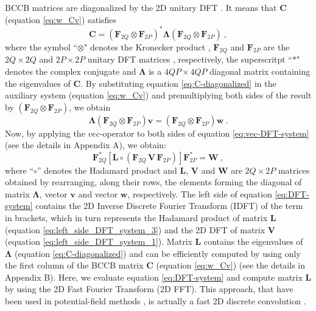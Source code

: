 BCCB matrices are diagonalized by the 2D unitary DFT 
\citep[][ p. 185]{davis1979}. It means that $\mathbf{C}$ (equation \ref{eq:w_Cv}) 
satisfies 
\begin{equation}
\mathbf{C} = 
\left(\mathbf{F}_{2Q} \otimes \mathbf{F}_{2P} \right)^{\ast} 
\boldsymbol{\Lambda}
\left(\mathbf{F}_{2Q} \otimes \mathbf{F}_{2P} \right) \: ,
\label{eq:C-diagonalized}
\end{equation}
where the symbol ``$\otimes$" denotes the Kronecker product \citep{neudecker1969},
$\mathbf{F}_{2Q}$ and $\mathbf{F}_{2P}$ are the $2Q \times 2Q$ and $2P \times 2P$ 
unitary DFT matrices \citep[][ p. 31]{davis1979}, respectively, the superscritpt 
``$\ast$" denotes the complex conjugate and $\boldsymbol{\Lambda}$ is a 
$4QP \times 4QP$ diagonal matrix containing the eigenvalues of $\mathbf{C}$.
By substituting equation \ref{eq:C-diagonalized} in the auxiliary system 
(equation \ref{eq:w_Cv}) and premultiplying both
sides of the result by $\left(\mathbf{F}_{2Q} \otimes \mathbf{F}_{2P} \right)$, 
we obtain
\begin{equation}
\boldsymbol{\Lambda} \left(\mathbf{F}_{2Q} \otimes \mathbf{F}_{2P} \right) 
\mathbf{v} = \left(\mathbf{F}_{2Q} \otimes \mathbf{F}_{2P} \right) 
\mathbf{w} \: .
\label{eq:vec-DFT-system}
\end{equation}
Now, by applying the $vec$-operator to both sides of equation \ref{eq:vec-DFT-system} 
(see the details in Appendix A), we obtain:
\begin{equation}
\mathbf{F}_{2Q}^{\ast} \left[ 
\mathbf{L} \circ \left(\mathbf{F}_{2Q} \, \mathbf{V} \, \mathbf{F}_{2P} \right) 
\right] \mathbf{F}_{2P}^{\ast} = \mathbf{W} \: ,
\label{eq:DFT-system}
\end{equation}
where ``$\circ$'' denotes the Hadamard product \citep[][ p. 298]{horn_johnson1991} and 
$\mathbf{L}$, $\mathbf{V}$ and $\mathbf{W}$ are $2Q \times 2P$ matrices obtained 
by rearranging, along their rows, the elements forming the diagonal of matrix 
$\boldsymbol{\Lambda}$, vector $\mathbf{v}$ and vector $\mathbf{w}$, respectively.
The left side of equation \ref{eq:DFT-system} contains the 2D 
Inverse Discrete Fourier Transform (IDFT) of the term in brackets, which in turn
represents the Hadamard product of matrix $\mathbf{L}$ (equation \ref{eq:left_side_DFT_system_3})
and the 2D DFT of matrix $\mathbf{V}$ (equation \ref{eq:left_side_DFT_system_1}).
Matrix $\mathbf{L}$ contains the eigenvalues 
of $\boldsymbol{\Lambda}$ (equation \ref{eq:C-diagonalized}) and can be 
efficiently computed by using only the first column of the BCCB matrix 
$\mathbf{C}$ (equation \ref{eq:w_Cv}) (see the details in Appendix B).
Here, we evaluate equation \ref{eq:DFT-system} and compute matrix $\mathbf{L}$
by using the 2D Fast Fourier Transform (2D FFT).
This approach, that have been used in potential-field methods
\citep[e.g.,][]{zhang-wong2015, zhang-etal2016, qiang_etal2019}, is actually 
a fast 2D discrete convolution \citep[e.g.,][ p. 213]{vanloan1992}.


